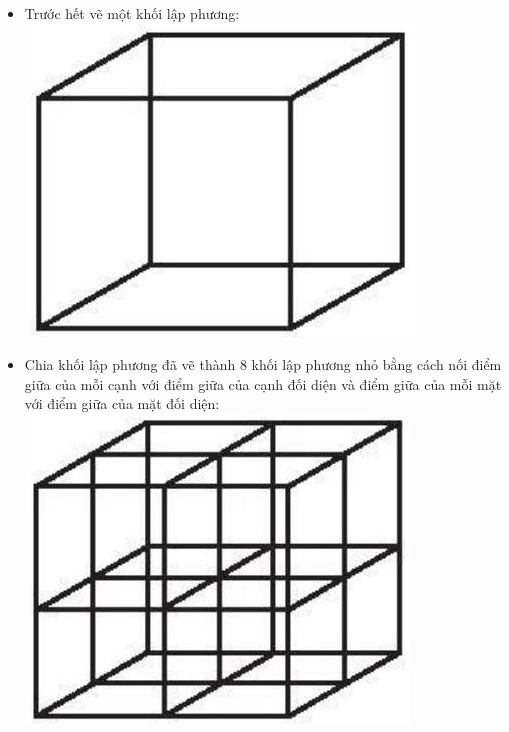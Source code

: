 \documentclass[10pt]{article}
\begin{document}
\begin{itemize}
  \item Trước hết vẽ một khối lập phương:\\
\includegraphics[max width=\textwidth, center]{2025_10_23_57761e23b8c46a11c3efg-20}
  \item Chia khối lập phương đã vẽ thành 8 khối lập phương nhỏ bằng cách nối điểm giữa của mỗi cạnh với điểm giữa của cạnh đối diện và điểm giữa của mỗi mặt với điểm giữa của mặt đối diện:\\
\includegraphics[max width=\textwidth, center]{2025_10_23_57761e23b8c46a11c3efg-21(2)}

\end{itemize}
\end{document}
